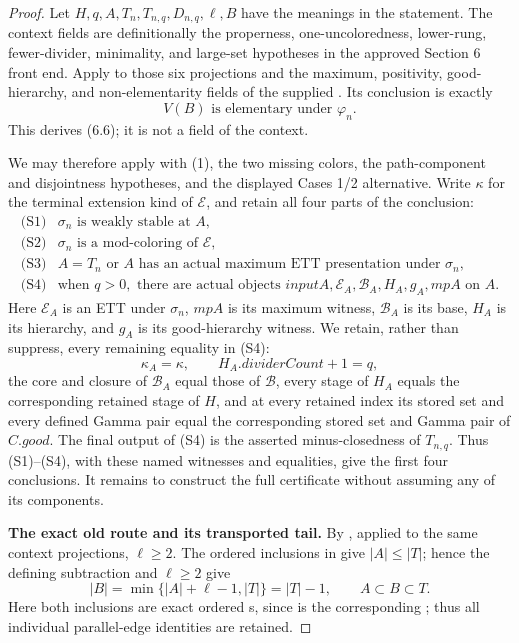 \begin{proof}
Let \(H,q,A,T_n,T_{n,q},D_{n,q},\ell,B\) have the meanings in the
statement.  The context fields are definitionally the properness,
one-uncoloredness, lower-rung, fewer-divider, minimality, and large-set
hypotheses in the approved Section 6 front end.  Apply
 to those six
projections and the maximum, positivity, good-hierarchy, and
non-elementarity fields of the supplied
.  Its conclusion is exactly
\[
       V(B)\text{ is elementary under }\varphi_n.              \tag{1}
\]
This derives (6.6); it is not a field of the context.

We may therefore apply  with (1), the
two missing colors, the path-component and disjointness hypotheses, and
the displayed Cases 1/2 alternative.  Write \(\kappa\) for the terminal
extension kind of \(\mathcal E\), and retain all four parts of the
conclusion:
\[
\begin{array}{ll}
\text{(S1)}&\sigma_n\text{ is weakly stable at }A,\\
\text{(S2)}&\sigma_n\text{ is a mod-coloring of }\mathcal E,\\
\text{(S3)}&A=T_n\text{ or }A\text{ has an actual maximum ETT
presentation under }\sigma_n,\\
\text{(S4)}&\text{when }q>0,\text{ there are actual objects }
 \mathit{inputA},\mathcal E_A,\mathcal B_A,H_A,g_A,\mathit{mpA}
 \text{ on }A.
\end{array}                                                     \tag{2}
\]
Here \(\mathcal E_A\) is an ETT under \(\sigma_n\), \(\mathit{mpA}\) is
its maximum witness, \(\mathcal B_A\) is its base, \(H_A\) is its
hierarchy, and \(g_A\) is its good-hierarchy witness.  We retain, rather
than suppress, every remaining equality in (S4):
\[
 \kappa_A=\kappa,\qquad H_A.\mathit{dividerCount}+1=q,           \tag{2a}
\]
the core and closure of \(\mathcal B_A\) equal those of \(\mathcal B\),
every stage of \(H_A\) equals the corresponding retained stage of \(H\),
and at every retained index its stored set and every defined Gamma pair
equal the corresponding stored set and Gamma pair of \(C.\mathit{good}\).
The final output of (S4) is the asserted minus-closedness of \(T_{n,q}\).
Thus (S1)--(S4), with these named witnesses and equalities, give the first
four conclusions.  It remains to construct the full certificate without
assuming any of its components.

\textbf{The exact old route and its transported tail.}
By , applied to the same
context projections, \(\ell\geq2\).  The ordered inclusions in
 give \(|A|\leq|T|\); hence the defining
subtraction and \(\ell\geq2\) give
\[
 |B|=\min\{|A|+\ell-1,|T|\}=|T|-1,\qquad A\subset B\subset T.   \tag{3}
\]
Here both inclusions are exact ordered
s, since
 is the corresponding
; thus all individual parallel-edge identities
are retained.


\end{proof}
